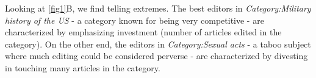 \documentclass[letterpaper,10pt,a4paper]{article}
\begin{document}
Looking at \ref{fig1}B, we find telling extremes. The best editors in {\it Category:Military history of the US} - a category known for being very competitive -  are characterized by emphasizing investment (number of articles edited in the category). On the other end, the editors in {\it Category:Sexual acts} - a taboo subject where much editing could be considered perverse - are characterized by divesting in touching many articles in the category.




\vspace{1cm}

  
\end{document}
